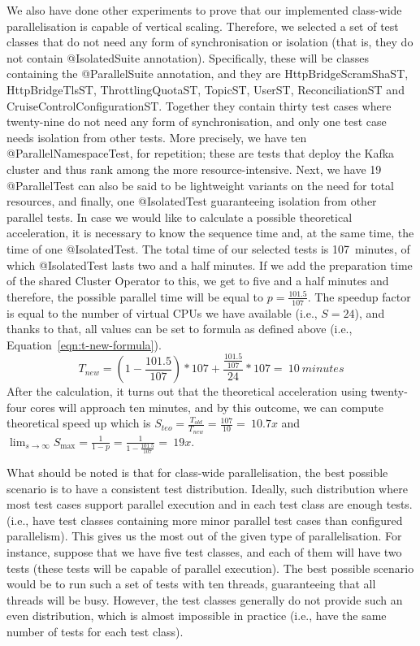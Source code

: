 We also have done other experiments to prove that our implemented class-wide parallelisation is capable of vertical scaling.
Therefore, we selected a set of test classes that do not need any form of synchronisation or isolation (that is, they do not contain @IsolatedSuite annotation).
Specifically, these will be classes containing the @ParallelSuite annotation, and they are HttpBridgeScramShaST, HttpBridgeTlsST,
ThrottlingQuotaST, TopicST, UserST, ReconciliationST and CruiseControlConfigurationST.
Together they contain thirty test cases where twenty-nine do not need any form of synchronisation, and only one test case needs isolation from other tests.
More precisely, we have ten @ParallelNamespaceTest, for repetition;
these are tests that deploy the Kafka cluster and thus rank among the more resource-intensive.
Next, we have 19 @ParallelTest can also be said to be lightweight variants on the need for total resources, and finally, one @IsolatedTest
guaranteeing isolation from other parallel tests.
In case we would like to calculate a possible theoretical acceleration, it is necessary to know the sequence time and, at the same time, the time of one @IsolatedTest.
The total time of our selected tests is 107~minutes, of which @IsolatedTest lasts two and a half minutes.
If we add the preparation time of the shared Cluster Operator to this, we get to five and a half minutes and therefore, the possible parallel time will be equal to $p = \frac{101.5}{107}$.
The speedup factor is equal to the number of virtual CPUs we have available (i.e., $S = 24$), and thanks to that, all values can be set to
formula as defined above (i.e., Equation~\eqref {eqn:t-new-formula}).
\begin{equation}
    \label{eqn:class-wide-time-ocp}
    T_{new} = (1 - \frac{101.5}{107}) * 107 +  \frac{\frac{101.5}{107}}{24} * 107 =~10~minutes
    \tag{6}
\end{equation}
After the calculation, it turns out that the theoretical acceleration using twenty-four cores will approach ten minutes,
and by this outcome, we can compute theoretical speed up which is $S_{teo} = \frac{T_{old}}{T_{new}} = \frac{107}{10} =~10.7x$
and $\lim_{s\to\infty} S_{\max} = \frac{1}{1-p} = \frac{1}{1-\frac{101.5}{107}} =~19x$.

What should be noted is that for class-wide parallelisation, the best possible scenario is to have a consistent test distribution.
Ideally, such distribution where most test cases support parallel execution and in each test class are enough tests.
(i.e., have test classes containing more minor parallel test cases than configured parallelism).
This gives us the most out of the given type of parallelisation.
For instance, suppose that we have five test classes, and each of them will have two tests (these tests will be capable of parallel execution).
The best possible scenario would be to run such a set of tests with ten threads, guaranteeing that all threads will be busy. However, the test classes generally do not provide such an even distribution, which is almost impossible in practice
(i.e., have the same number of tests for each test class).

